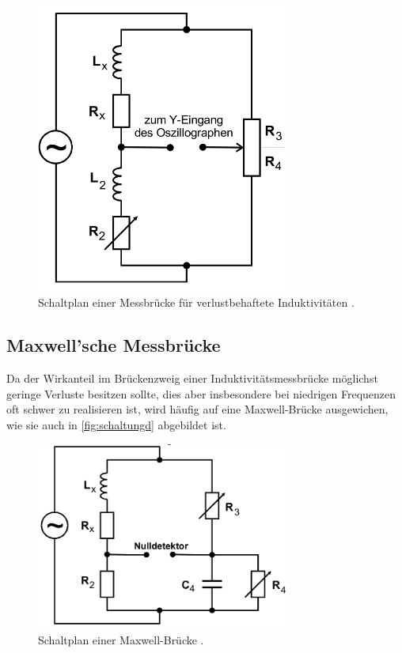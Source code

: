 \begin{figure}[H]
    \centering
    \includegraphics[width=0.75\textwidth]{dateien/aufgabec).png}
    \caption{Schaltplan einer Messbrücke für verlustbehaftete Induktivitäten \cite{anleitung}.}
    \label{fig:schaltungc}
\end{figure}

\subsection{Maxwell'sche Messbrücke}
Da der Wirkanteil im Brückenzweig einer Induktivitätsmessbrücke möglichst geringe Verluste besitzen sollte, dies aber
insbesondere bei niedrigen Frequenzen oft schwer zu realisieren ist, wird häufig auf eine Maxwell-Brücke ausgewichen, wie
sie auch in \autoref{fig:schaltungd} abgebildet ist.

\begin{figure}[H]
    \centering
    \includegraphics[width=0.75\textwidth]{dateien/aufgabed).png}
    \caption{Schaltplan einer Maxwell-Brücke \cite{anleitung}.}
    \label{fig:schaltungd}
\end{figure}

